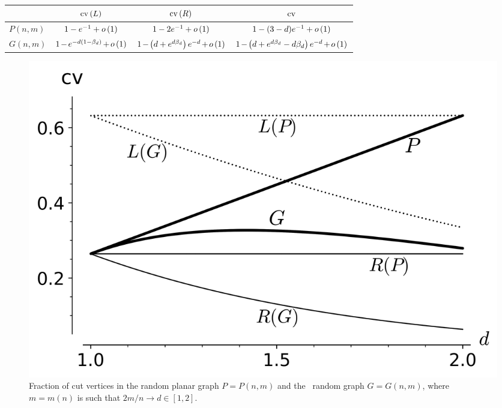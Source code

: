 \begin{center}
   \def\arraystretch{1.8}\tabcolsep=3pt
\begin{tabular}{l|c|c|c}
    & $\operatorname{cv}\left(L\right)$ & $\operatorname{cv}\left(R\right)$ & $\operatorname{cv}$ \\[0.1cm]
    \hline
    $P(n,m)$ & $1-e^{-1}+o\left(1\right)$ & $1-2e^{-1}+o\left(1\right)$ & $1-(3-d)e^{-1}+o\left(1\right)$ \\[0.1cm]
    \hline
    $G(n,m)$ & $1\hspace{-0.035cm}-\hspace{-0.035cm}e^{-d\left(1-\beta_d\right)}\hspace{-0.035cm}+\hspace{-0.035cm}\smallo{1}$ & $1\hspace{-0.035cm}-\hspace{-0.035cm}\left(d+e^{d\beta_d}\right)e^{-d}\hspace{-0.035cm}+\hspace{-0.035cm}\smallo{1}$ & $1\hspace{-0.035cm}-\hspace{-0.035cm}\left(d+e^{d\beta_d}-d\beta_d\right)e^{-d}\hspace{-0.035cm}+\hspace{-0.035cm}\smallo{1}$
\end{tabular}
\end{center}


\begin{figure}
\begin{center}
 	\includegraphics[scale=0.5]{cut-vertices.png}
 	\vspace{-0.5cm}
\end{center}
	\caption{Fraction of cut vertices in the random planar graph $P=P(n,m)$ and the \ER\ random graph $G=G(n,m)$, where $m=m(n)$ is such that $2m/n\to d\in [1,2]$.}
	\label{fig:cut_vertices}
\end{figure}

